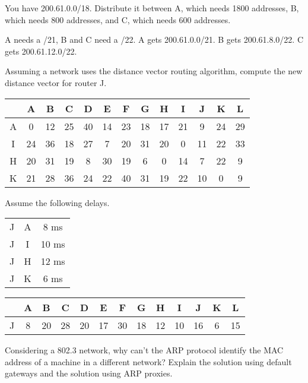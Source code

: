 \begin{Exercise}
You have 200.61.0.0/18. Distribute it between A, which needs 1800 addresses, B, which needs 800 addresses, and C, which needs 600 addresses.
\end{Exercise}
\begin{Answer}
A needs a /21, B and C need a /22.
A gets 200.61.0.0/21. B gets 200.61.8.0/22. C gets 200.61.12.0/22.
\end{Answer}

\begin{Exercise}
Assuming a network uses the distance vector routing algorithm, compute the new distance vector for router J.

\begin{center}
\begin{tabular}{c|c|c|c|c|c|c|c|c|c|c|c|c}
      & A & B & C & D & E & F & G & H & I & J & K & L \\ \hline
    A & 0 & 12 & 25 & 40 & 14 & 23 & 18 & 17 & 21 & 9 & 24 & 29 \\
    I & 24 & 36 & 18 & 27 & 7 & 20 & 31 & 20 & 0 & 11 & 22 & 33 \\
    H & 20 & 31 & 19 & 8 & 30 & 19 & 6 & 0 & 14 & 7 & 22 & 9 \\
    K & 21 & 28 & 36 & 24 & 22 & 40 & 31 & 19 & 22 & 10 & 0 & 9
\end{tabular}
\end{center}

Assume the following delays.

\begin{center}
\begin{tabular}{c|c|c}
    J & A &  8 ms \\
    J & I & 10 ms \\
    J & H & 12 ms \\
    J & K &  6 ms
\end{tabular}
\end{center}
\end{Exercise}
\begin{Answer}
\begin{center}
\begin{tabular}{c|c|c|c|c|c|c|c|c|c|c|c|c}
      & A & B & C & D & E & F & G & H & I & J & K & L \\ \hline
    J & 8 & 20 & 28 & 20 & 17 & 30 & 18 & 12 & 10 & 16 & 6 & 15
\end{tabular}
\end{center}
\end{Answer}

\begin{Exercise}
Considering a 802.3 network, why can't the ARP protocol identify the MAC address of a machine in a different network?
Explain the solution using default gateways and the solution using ARP proxies.
\end{Exercise}

